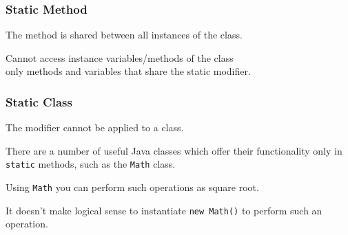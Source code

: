 \begin{frame}
\frametitle{Static Method}
\begin{changemargin}{1cm}

The method is shared between all instances of the class. 

Cannot access instance variables/methods of the class\\
\quad only methods and variables that share the static modifier.

\end{changemargin}
\end{frame}

\begin{frame}
\frametitle{Static Class}
\begin{changemargin}{1cm}

The modifier cannot be applied to a class. 

There are a number of useful Java classes which offer their functionality only in \texttt{static} methods, such as the \texttt{Math} class. 

Using \texttt{Math} you can perform such operations as square root.

It doesn't make logical sense to instantiate \texttt{new Math()} to perform such an operation. 

\end{changemargin}
\end{frame}


